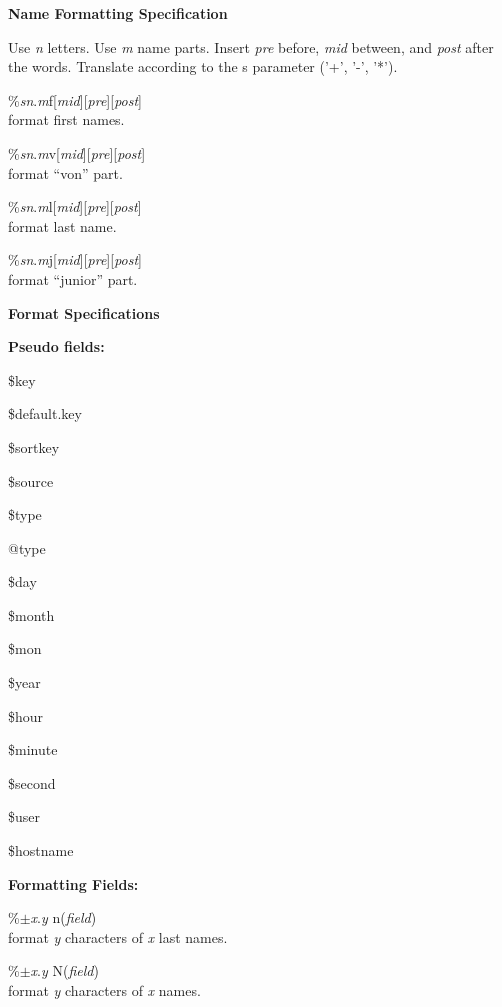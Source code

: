 \documentclass[a4paper]{article}
\newenvironment{FlatList}{\begin{list}{}{%
      \topsep=0pt\itemsep=0pt\parsep=0pt\let\makelabel=\flatlistlabel}}{\end{list}}%
\newcommand\flatlistlabel[1]{\descriptionlabel{\sf #1}}
\newcommand\Section[1]{\begin{center}\normalsize\bf
    #1\end{center}\nobreak }
\begin{document}
\begin{multicols}{4}
  \Section{Name Formatting Specification}
    Use {\it n}\/ letters. Use {\it m} name parts.  Insert {\it pre}\/
    before, {\it mid} between, and {\it post} after the words.
    Translate according to the s parameter ('+', '-', '*').
  \begin{FlatList}
  \item [\%{\it s}{\it n}.{\it m}\/f{[{\it mid}][{\it pre}][{\it post}]}]\ \\
    format first names. 
  \item [\%{\it s}{\it n}.{\it m}\/v{[{\it mid}][{\it pre}][{\it post}]}]\ \\
    format ``von'' part.
  \item [\%{\it s}{\it n}.{\it m}\/l{[{\it mid}][{\it pre}][{\it post}]}]\ \\
    format last name.
  \item [\%{\it s}{\it n}.{\it m}\/j{[{\it mid}][{\it pre}][{\it post}]}]\ \\
    format ``junior'' part.
  \end{FlatList}
  \Section{Format Specifications}
  \textbf{Pseudo fields:} 
  \begin{FlatList}
  \item [\$key]
  \item [\$default.key]
  \item [\$sortkey]
  \item [\$source]
  \item [\$type]
  \item [@type]
  \item [\$day]
  \item [\$month]
  \item [\$mon]
  \item [\$year]
  \item [\$hour]
  \item [\$minute]
  \item [\$second]
  \item [\$user]
  \item [\$hostname]
  \end{FlatList}
  \textbf{Formatting Fields:} 
  \begin{FlatList}
  \item [\%$\pm ${\it x}.{\it y}\/ n({\it field}\/)]\ \\
    format {\it y}\/ characters of {\it x}\/ last names.
  \item [\%$\pm ${\it x}.{\it y}\/ N({\it field}\/)]\ \\
    format {\it y}\/ characters of {\it x}\/ names.

\end{FlatList}
\end{multicols}
\end{document}

